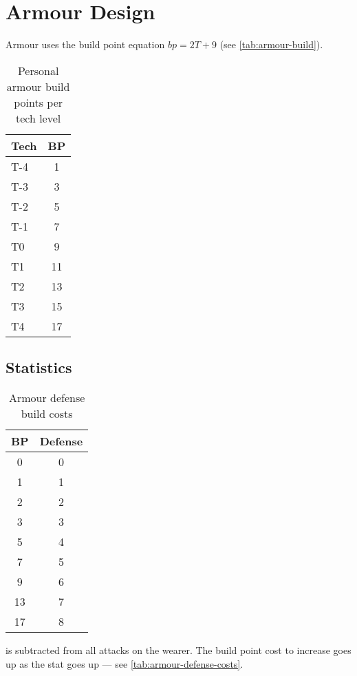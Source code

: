 \section[Personal Armour Design]{Armour Design}\label{sec:personal-armour-design} %

Armour uses the build point equation $bp = 2T + 9$ (see \autoref{tab:armour-build}).

\begin{table}[ht]
\centering
\begin{tabular}{lc}
\toprule
Tech	& BP \\
\midrule
T-4	& 1 \\
T-3	& 3 \\
T-2	& 5 \\
T-1	& 7 \\
T0	& 9 \\
T1	& 11 \\
T2	& 13 \\
T3	& 15 \\
T4	& 17 \\
\bottomrule
\end{tabular}
\caption{Personal armour build points per tech level}
\label{tab:armour-build}
\end{table}

\subsection{Statistics}
\label{sec:personal-armour-statistics}

\begin{table}\centering
\begin{tabular}{cc}
\toprule
BP	& Defense \\
\midrule
0 & 0 \\
1 & 1 \\
2 & 2 \\
3 & 3 \\
5 & 4 \\
7 & 5 \\
9 & 6 \\
13 & 7 \\
17 & 8 \\
\bottomrule
\end{tabular}
\caption{Armour defense build costs}
\label{tab:armour-defense-costs}
\end{table}

 is subtracted from all attacks on the wearer. The build point cost to increase  goes up as the stat goes up --- see \autoref{tab:armour-defense-costs}.

